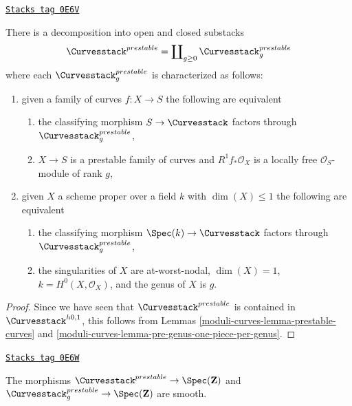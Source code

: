 \begin{lemma}
\label{moduli-curves-lemma-prestable-one-piece-per-genus}
\href{https://stacks.math.columbia.edu/tag/0E6V}{\texttt{Stacks tag 0E6V}}

There is a decomposition into open and closed substacks
$$
\Curvesstack^{prestable} = \coprod\nolimits_{g \geq 0}
\Curvesstack^{prestable}_g
$$
where each $\Curvesstack^{prestable}_g$ is characterized as follows:
\begin{enumerate}
\item given a family of curves $f : X \to S$ the following are equivalent
\begin{enumerate}
\item the classifying morphism $S \to \Curvesstack$ factors
through $\Curvesstack^{prestable}_g$,
\item $X \to S$ is a prestable family of curves and
$R^1f_*\mathcal{O}_X$ is a locally free $\mathcal{O}_S$-module of rank $g$,
\end{enumerate}
\item given $X$ a scheme proper over a field $k$ with
$\dim(X) \leq 1$ the following are equivalent
\begin{enumerate}
\item the classifying morphism $\Spec(k) \to \Curvesstack$
factors through $\Curvesstack^{prestable}_g$,
\item the singularities of $X$ are at-worst-nodal, $\dim(X) = 1$,
$k = H^0(X, \mathcal{O}_X)$, and the genus of $X$ is $g$.
\end{enumerate}
\end{enumerate}
\end{lemma}

\begin{proof}
Since we have seen that $\Curvesstack^{prestable}$ is contained
in $\Curvesstack^{h0, 1}$, this
follows from Lemmas \ref{moduli-curves-lemma-prestable-curves} and
\ref{moduli-curves-lemma-pre-genus-one-piece-per-genus}.
\end{proof}

\begin{lemma}
\label{moduli-curves-lemma-prestable-curves-smooth}
\href{https://stacks.math.columbia.edu/tag/0E6W}{\texttt{Stacks tag 0E6W}}

The morphisms
$\Curvesstack^{prestable} \to \Spec(\mathbf{Z})$ and
$\Curvesstack^{prestable}_g \to \Spec(\mathbf{Z})$ are
smooth.
\end{lemma}


